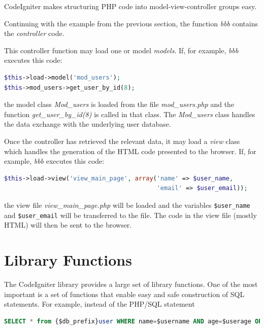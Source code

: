 \documentclass[11pt,oneside,a4paper]{memoir}
\begin{document}
CodeIgniter makes structuring PHP code into model-view-controller groups easy.

Continuing with the example from the previous section, the function \emph{bbb} contains the
\emph{controller} code.

This controller function may load one or model \emph{models}. If, for example, \emph{bbb}
executes this code:

\begin{lstlisting}[language=PHP]
$this->load->model('mod_users');
$this->mod_users->get_user_by_id(8);
\end{lstlisting}

\noindent
the model class \emph{Mod\_users} is loaded from the file \emph{mod\_users.php} and the function
\emph{get\_\-user\_\-by\_\-id(8)} is called in that class. The \emph{Mod\_users} class handles the data
exchange with the underlying user database.

Once the controller has retrieved the relevant data, it may load a \emph{view} class which handles
the generation of the HTML code presented to the browser. If, for example, \emph{bbb} executes
this code:

\begin{lstlisting}[language=PHP]
$this->load->view('view_main_page', array('name' => $user_name,
                                          'email' => $user_email));
\end{lstlisting}

\noindent
the view file \emph{view\_main\_page.php} will be loaded and the variables \texttt{\$user\_name} and
\texttt{\$user\_email} will be transferred to the file. The code in the view file (mostly HTML) will
then be sent to the browser.

\section{Library Functions}

The CodeIgniter library provides a large set of library functions. One of the most important is a
set of functions that enable easy and safe construction of SQL statements. For example, instead of
the PHP/SQL statement

\begin{lstlisting}[language=SQL]
SELECT * from {$db_prefix}user WHERE name=$username AND age=$userage ORDER BY id;
\end{lstlisting}
\end{document}
